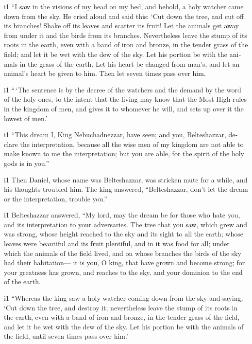 \begin{paracol}{2}
\begin{otherlanguage}{english}
i1  ``I saw in the visions of my head on my bed, and
behold, a holy watcher came down from the sky.  He cried
aloud and said this: `Cut down the tree, and cut off its branches! Shake
off its leaves and scatter its fruit! Let the animals get away from
under it and the birds from its branches.  Nevertheless
leave the stump of its roots in the earth, even with a band of iron and
bronze, in the tender grass of the field; and let it be wet with the dew
of the sky. Let his portion be with the animals in the grass of the
earth.  Let his heart be changed from man's, and let an
animal's heart be given to him. Then let seven times pass over him.

i1  ``\,`The sentence is by the decree of the watchers
and the demand by the word of the holy ones, to the intent that the
living may know that the Most High rules in the kingdom of men, and
gives it to whomever he will, and sets up over it the lowest of men.'

i1  ``This dream I, King Nebuchadnezzar, have seen; and
you, Belteshazzar, declare the interpretation, because all the wise men
of my kingdom are not able to make known to me the interpretation; but
you are able, for the spirit of the holy gods is in you.''

i1  Then Daniel, whose name was Belteshazzar, was
stricken mute for a while, and his thoughts troubled him. The king
answered, ``Belteshazzar, don't let the dream or the interpretation,
trouble you.''

i1 Belteshazzar answered, ``My lord, may the dream be for those who hate
you, and its interpretation to your adversaries.  The
tree that you saw, which grew and was strong, whose height reached to
the sky and its sight to all the earth;  whose leaves
were beautiful and its fruit plentiful, and in it was food for all;
under which the animals of the field lived, and on whose branches the
birds of the sky had their habitation---  it is you, O
king, that have grown and become strong; for your greatness has grown,
and reaches to the sky, and your dominion to the end of the earth.

i1  ``Whereas the king saw a holy watcher coming down
from the sky and saying, `Cut down the tree, and destroy it;
nevertheless leave the stump of its roots in the earth, even with a band
of iron and bronze, in the tender grass of the field, and let it be wet
with the dew of the sky. Let his portion be with the animals of the
field, until seven times pass over him.'


\end{otherlanguage}
\end{paracol}
